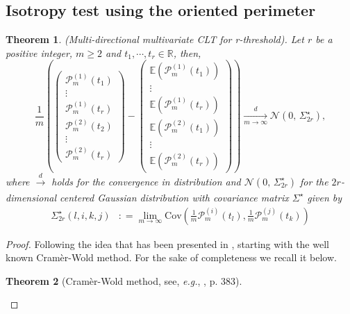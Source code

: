 \documentclass[12pt]{article}
\theoremstyle{Theorem}
\newtheorem{Theorem}{Theorem}[section]
\begin{document}
{\subsection{Isotropy test using the oriented perimeter}
\begin{Theorem}(Multi-directional multivariate CLT for r-threshold). Let $r$ be a positive integer, $m \geq 2$ and $t_{1}, \cdots,t_{r} \in \mathbb{R}$, then, 
\begin{equation*}
\frac{1}{m}\left(\begin{pmatrix} \mathcal{P}^{\scriptscriptstyle (1)}_{m}(t_{1}) \\  \vdots \\ \mathcal{P}^{\scriptscriptstyle (1)}_{m}(t_{r}) \\ \mathcal{P}^{\scriptscriptstyle (2)}_{m}(t_{2}) \\  \vdots \\ \mathcal{P}^{\scriptscriptstyle (2)}_{m}(t_{r})  \end{pmatrix} - \begin{pmatrix} \mathbb{E}(\mathcal{P}^{\scriptscriptstyle (1)}_{m}(t_{1}))  \\ \vdots \\ \mathbb{E}(\mathcal{P}^{\scriptscriptstyle (1)}_{m}(t_{r}))\\\mathbb{E}(\mathcal{P}^{\scriptscriptstyle (2)}_{m}(t_{1})) \\ \vdots \\ \mathbb{E}(\mathcal{P}^{\scriptscriptstyle (2)}_{m}(t_{r})) \end{pmatrix}\right) \xrightarrow[m \to \infty]{d} \mathcal{N}\left(0,\,\Sigma_{2r}^{\star}\right),
\end{equation*}
where $\xrightarrow[]{d}$ holds for the convergence in distribution and $\mathcal{N}\left(0,\,\Sigma_{2r}^{\star}\right)$ for the $2r$-dimensional centered Gaussian distribution with covariance matrix $\Sigma^\star$ given by
\begin{align*}
\Sigma^{\star}_{2r}(l,i,k,j) & : = \lim_{m \to \infty}\text{Cov}\left(\frac{1}{m}\mathcal{P}^{\scriptscriptstyle (i)}_{m}(t_{l}),  \frac{1}{m}\mathcal{P}^{\scriptscriptstyle (j)}_{m}(t_{k}) \right)
\end{align*}
\end{Theorem}
\begin{proof}
Following the idea that has been presented in \cite{Psymetrie}, 
starting with the well known Cram\`{e}r-Wold method. For the sake of completeness we recall it below.
\begin{Theorem}[Cram\`{e}r-Wold method, see, \textit{e.g.},  \cite{Billingsley}, p. 383]\label{Cramerwold}

\end{Theorem}
\end{proof}}
\end{document}
